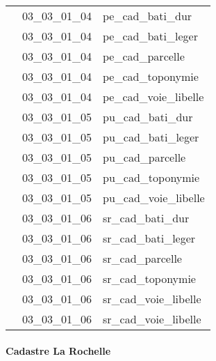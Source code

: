 \documentclass[12pt,titlepage,oneside]{book}
\begin{document}
\begin{supertabular}{|p{10cm}|c|p{15cm}|}
                    & 03\_03\_01\_04 & pe\_cad\_bati\_dur\\


                    & 03\_03\_01\_04 & pe\_cad\_bati\_leger\\


                    & 03\_03\_01\_04 & pe\_cad\_parcelle\\


                    & 03\_03\_01\_04 & pe\_cad\_toponymie\\


                    & 03\_03\_01\_04 & pe\_cad\_voie\_libelle\\


                    & 03\_03\_01\_05 & pu\_cad\_bati\_dur\\


                    & 03\_03\_01\_05 & pu\_cad\_bati\_leger\\


                    & 03\_03\_01\_05 & pu\_cad\_parcelle\\


                    & 03\_03\_01\_05 & pu\_cad\_toponymie\\


                    & 03\_03\_01\_05 & pu\_cad\_voie\_libelle\\


                    & 03\_03\_01\_06 & sr\_cad\_bati\_dur\\


                    & 03\_03\_01\_06 & sr\_cad\_bati\_leger\\


                    & 03\_03\_01\_06 & sr\_cad\_parcelle\\


                    & 03\_03\_01\_06 & sr\_cad\_toponymie\\


                    & 03\_03\_01\_06 & sr\_cad\_voie\_libelle\\


                    & 03\_03\_01\_06 & sr\_cad\_voie\_libelle\\
\hline
\end{supertabular}


\paragraph{Cadastre La Rochelle}
\noindent
\vspace{\baselineskip}
\end{document}
